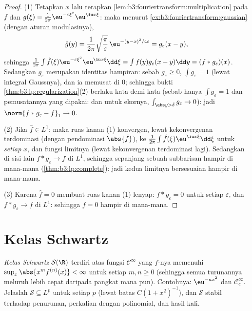 \begin{proof}
(1) Tetapkan $x$ lalu terapkan
\cref{lem:b3:fouriertransform:multiplication} pada $f$ dan
$g(\xi) = \frac1{2\pi}\eu^{-\varepsilon\xi^2}\eu^{\iu x\xi}$:
maka menurut \cref{ex:b3:fouriertransform:gaussian} (dengan aturan
modulasinya),
\[
\hat g(y) = \frac1{2\pi}\sqrt{\frac\pi\varepsilon}\,
\eu^{-(y - x)^2/4\varepsilon} = g_\varepsilon(x - y),
\]
sehingga $\frac1{2\pi}\int\hat f(\xi)\eu^{-\varepsilon\xi^2}
\eu^{\iu x\xi}\dd\xi = \int f(y)g_\varepsilon(x - y)\dd y =
(f*g_\varepsilon)(x)$. Sedangkan $g_\varepsilon$ merupakan
identitas hampiran: sebab $g_\varepsilon \geq 0$,
$\int g_\varepsilon = 1$ (lewat integral Gaussnya), dan ia memusat di
$0$; sehingga bukti \cref{thm:b3:lp:regularization}(2) berlaku
kata demi kata (sebab hanya $\int g_\varepsilon = 1$ dan pemusatannya yang
dipakai: dan untuk ekornya, $\int_{\abs y > \delta}g_\varepsilon \to
0$): jadi $\norm{f * g_\varepsilon - f}_1 \to 0$.

(2) Jika $\hat f \in L^1$: maka ruas kanan (1) konvergen, lewat
kekonvergenan terdominasi (dengan pendominasi $\abs{\hat f}$), ke $\frac1{2\pi}\int\hat
f(\xi)\eu^{\iu x\xi}\dd\xi$ untuk \emph{setiap} $x$, dan fungsi
limitnya  (lewat kekonvergenan terdominasi lagi). Sedangkan di sisi lain $f
* g_\varepsilon \to f$ di $L^1$, sehingga sepanjang sebuah subbarisan hampir di mana-mana
(\cref{thm:b3:lp:complete}): jadi kedua limitnya bersesuaian hampir di mana-mana.

(3) Karena $\hat f = 0$ membuat ruas kanan (1) lenyap: $f *
g_\varepsilon = 0$ untuk setiap $\varepsilon$, dan $f *
g_\varepsilon \to f$ di $L^1$: sehingga $f = 0$ hampir di mana-mana.
\end{proof}

\section{Kelas Schwartz}

\begin{definition}\label{def:b3:fouriertransform:schwartz}
\emph{Kelas Schwartz} $\mathcal
S(\R)$ terdiri atas fungsi $\mathcal C^\infty$ yang $f$-nya memenuhi
$\sup_x\abs{x^m f^{(n)}(x)} < \infty$ untuk setiap $m, n \geq 0$
(sehingga semua turunannya meluruh lebih cepat daripada pangkat mana pun). Contohnya:
$\eu^{-ax^2}$ dan $\mathcal C_c^\infty$. Jelaslah $\mathcal S
\subseteq L^p$ untuk setiap $p$ (lewat batas $C(1 + x^2)^{-1}$), dan
$\mathcal S$ stabil terhadap penurunan, perkalian dengan
polinomial, dan hasil kali.
\end{definition}

